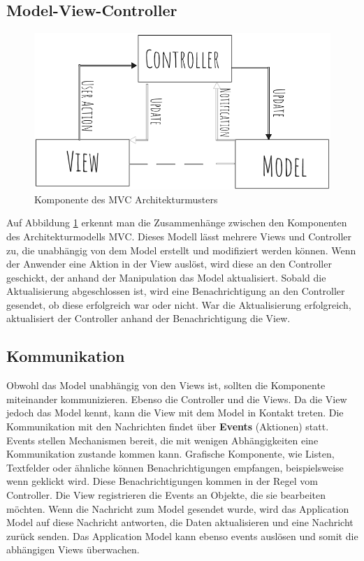 \subsection*{Model-View-Controller}
\begin{figure}[h] 
\centering
\includegraphics[scale=0.4]{fig/mvc.png} 
\caption{Komponente des MVC Architekturmusters}
\label{fig:MVC}
\end{figure} 
Auf Abbildung \ref{fig:MVC} erkennt man die Zusammenh\"ange zwischen den Komponenten des Architekturmodells \ac{MVC}. Dieses Modell l\"asst mehrere Views und Controller zu, die unabh\"angig von dem Model erstellt und modifiziert werden k\"onnen\cite{Curry2008}.
Wenn der Anwender eine Aktion in der View ausl\"ost, wird diese an den Controller geschickt, der anhand der Manipulation das Model aktualisiert. Sobald die Aktualisierung abgeschlossen ist, wird eine Benachrichtigung an den Controller gesendet, ob diese erfolgreich war oder nicht. War die Aktualisierung erfolgreich, aktualisiert der Controller anhand der Benachrichtigung die View.
\subsection*{Kommunikation}
Obwohl das Model unabh\"angig von den Views ist, sollten die Komponente miteinander kommunizieren. Ebenso die Controller und die Views. Da die View jedoch das Model kennt, kann die View mit dem Model in Kontakt treten. Die Kommunikation mit den Nachrichten findet \"uber \textbf{Events} (Aktionen) statt. Events stellen Mechanismen bereit, die mit wenigen Abh\"angigkeiten eine Kommunikation zustande kommen kann.
Grafische Komponente, wie Listen, Textfelder oder \"ahnliche k\"onnen Benachrichtigungen empfangen, beispielsweise wenn geklickt wird. Diese Benachrichtigungen kommen in der Regel vom Controller. Die View registrieren die Events an Objekte, die sie bearbeiten m\"ochten. Wenn die Nachricht zum Model gesendet wurde, wird das Application Model auf diese Nachricht antworten, die Daten aktualisieren und eine Nachricht zur\"uck senden. Das Application Model kann ebenso events ausl\"osen und somit die abh\"angigen Views \"uberwachen\cite{Deacon2005}. 

